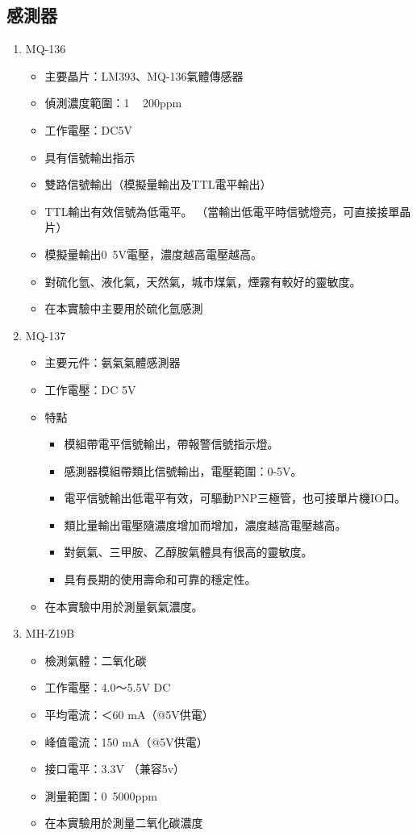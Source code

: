 	\subsection{感測器}
	\begin{enumerate}
		\item MQ-136 \begin{itemize}
			\item 主要晶片：LM393、MQ-136氣體傳感器
			\item 偵測濃度範圍：1 ~ 200ppm 
			\item 工作電壓：DC5V
			\item 具有信號輸出指示
			\item 雙路信號輸出（模擬量輸出及TTL電平輸出）
			\item TTL輸出有效信號為低電平。 （當輸出低電平時信號燈亮，可直接接單晶片）
			\item 模擬量輸出0~5V電壓，濃度越高電壓越高。
			\item 對硫化氫、液化氣，天然氣，城市煤氣，煙霧有較好的靈敏度。
			\item 在本實驗中主要用於硫化氫感測
		\end{itemize}
		\item MQ-137 \begin{itemize}
			\item 主要元件：氨氣氣體感測器
			\item 工作電壓：DC 5V
			\item 特點 \begin{itemize}
				\item 模組帶電平信號輸出，帶報警信號指示燈。
				\item 感測器模組帶類比信號輸出，電壓範圍：0-5V。
				\item 電平信號輸出低電平有效，可驅動PNP三極管，也可接單片機IO口。
				\item 類比量輸出電壓隨濃度增加而增加，濃度越高電壓越高。
				\item 對氨氣、三甲胺、乙醇胺氣體具有很高的靈敏度。
				\item 具有長期的使用壽命和可靠的穩定性。
			\end{itemize}
			\item 在本實驗中用於測量氨氣濃度。
		\end{itemize}
		\item MH-Z19B \begin{itemize}
			\item 檢測氣體：二氧化碳
			\item 工作電壓：4.0～5.5V DC
			\item 平均電流：＜60 mA（@5V供電）
			\item 峰值電流：150 mA（@5V供電）
			\item 接口電平：3.3V （兼容5v）
			\item 測量範圍：0~5000ppm
			\item 在本實驗用於測量二氧化碳濃度
		\end{itemize}
	\end{enumerate}
